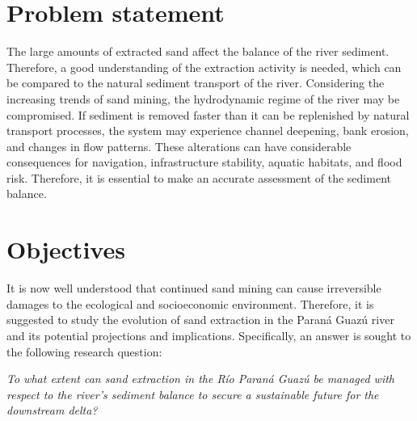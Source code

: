 \section{Problem statement}
The large amounts of extracted sand affect the balance of the river sediment. Therefore, a good understanding of the extraction activity is needed, which can be compared to the natural sediment transport of the river. Considering the increasing trends of sand mining, the hydrodynamic regime of the river may be compromised. If sediment is removed faster than it can be replenished by natural transport processes, the system may experience channel deepening, bank erosion, and changes in flow patterns. These alterations can have considerable consequences for navigation, infrastructure stability, aquatic habitats, and flood risk. Therefore, it is essential to make an accurate assessment of the sediment balance.



\section{Objectives}



It is now well understood that continued sand mining can cause irreversible damages to the ecological and socioeconomic environment. Therefore, it is suggested to study the evolution of sand extraction in the Paraná Guazú river and its potential projections and implications. Specifically, an answer is sought to the following research question:

\textit{To what extent can sand extraction in the Río Paraná Guazú be managed with respect to the river’s sediment balance to secure a sustainable future for the downstream delta?}

